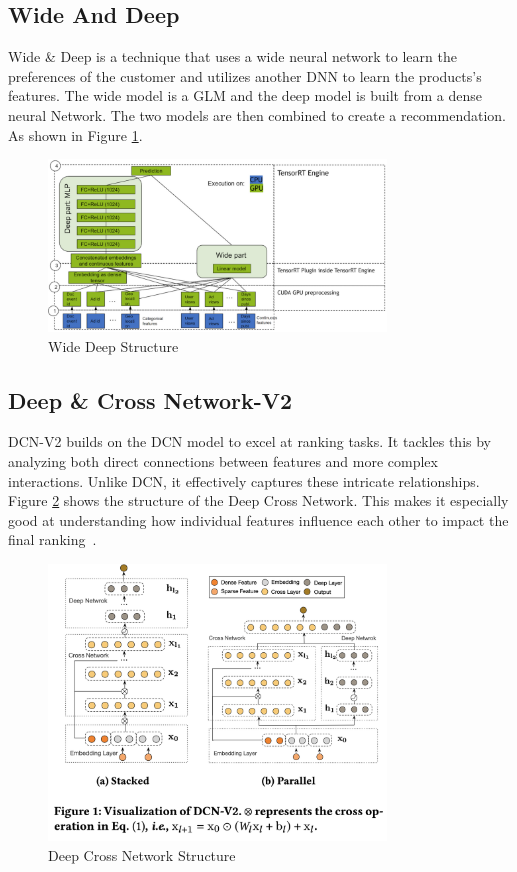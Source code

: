 \subsection{Wide And Deep}
Wide \& Deep is a technique that uses a wide neural network to learn the preferences of the customer and utilizes another DNN to learn the products's features. The wide model is a GLM and the deep model is built from a dense neural Network. The two models are then combined to create a recommendation. As shown in Figure \ref{fig:wide-deep}.
\begin{figure}[H]
    \centering
    \includegraphics[width=0.8\textwidth]{assets/wide_deep.png}
    \caption[Wide Deep Structure]{Wide Deep Structure~\cite{NvidiaRecSys}}
    \label{fig:wide-deep}
\end{figure}
\subsection{Deep \& Cross Network-V2}
DCN-V2 builds on the DCN model to excel at ranking tasks. It tackles this by analyzing both direct connections between features and more complex interactions. Unlike DCN, it effectively captures these intricate relationships. Figure \ref{fig:deep-cross-network} shows the structure of the Deep Cross Network. This makes it especially good at understanding how individual features influence each other to impact the final ranking~\cite{DCNv2}.
\begin{figure}[H]
    \centering
    \includegraphics[width=0.8\textwidth]{assets/dcn-v2.png}
    \caption[Deep Cross Network Structure]{Deep Cross Network Structure~\cite{DCNv2}}
    \label{fig:deep-cross-network}
\end{figure}

